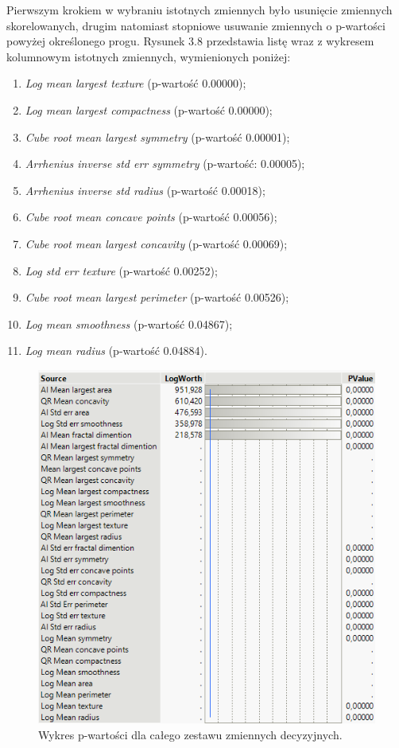Pierwszym krokiem w wybraniu istotnych zmiennych było usunięcie zmiennych skorelowanych, drugim natomiast stopniowe usuwanie zmiennych o p-wartości powyżej określonego progu. Rysunek 3.8 przedstawia listę wraz z wykresem kolumnowym istotnych zmiennych, wymienionych poniżej:

\begin{enumerate}
	\item \textit{Log mean largest texture} (p-wartość 0.00000);
	\item \textit{Log mean largest compactness} (p-wartość 0.00000);
	\item \textit{Cube root mean largest symmetry} (p-wartość 0.00001);
	\item \textit{Arrhenius inverse std err symmetry} (p-wartość: 0.00005);
	\item \textit{Arrhenius inverse std radius} (p-wartość 0.00018);
	\item \textit{Cube root mean concave points} (p-wartość 0.00056);
	\item \textit{Cube root mean largest concavity} (p-wartość 0.00069);
	\item \textit{Log std err texture} (p-wartość 0.00252);
	\item \textit{Cube root mean largest perimeter} (p-wartość 0.00526);
	\item \textit{Log mean smoothness} (p-wartość 0.04867);
	\item \textit{Log mean radius} (p-wartość 0.04884).
\end{enumerate}

\begin{figure}[!ht]
	\centering
	\includegraphics[width=0.9\linewidth]{Rozdzial3/pvalue1}
	\caption{Wykres p-wartości dla całego zestawu zmiennych decyzyjnych.}
	\label{fig:pvalue1}
\end{figure}

